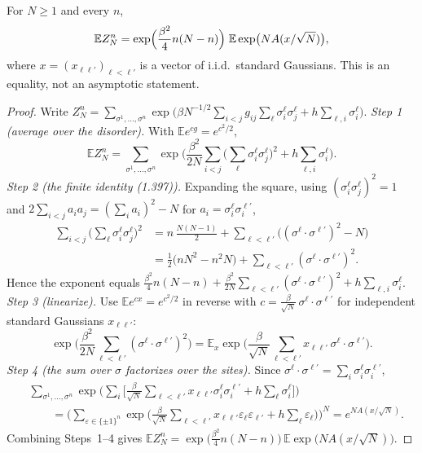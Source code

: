 \begin{lemma}\label{lem:sg-tal:replica-moment}
\leanok
{}
For $N\ge1$ and every $n$,
\[
\mathbb E Z_N^n=\exp\Bigl(\frac{\beta^2}{4}n(N-n)\Bigr)\;\mathbb E\exp\bigl(NA(x/\sqrt N)\bigr),
\]
where $x=(x_{\ell\ell'})_{\ell<\ell'}$ is a vector of i.i.d.\ standard Gaussians. This is an equality, not an asymptotic statement.
\end{lemma}
\begin{proof}
\leanok
Write $Z_N^n=\sum_{\sigma^1,\dots,\sigma^n}\exp\Big(\beta N^{-1/2}\sum_{i<j}g_{ij}\sum_\ell\sigma^\ell_i\sigma^\ell_j+h\sum_{\ell,i}\sigma^\ell_i\Big)$.
\emph{Step 1 (average over the disorder).} With $\mathbb Ee^{cg}=e^{c^2/2}$,
\[
\mathbb EZ_N^n=\sum_{\sigma^1,\dots,\sigma^n}\exp\Big(\frac{\beta^2}{2N}\sum_{i<j}\Big(\sum_\ell\sigma^\ell_i\sigma^\ell_j\Big)^2+h\sum_{\ell,i}\sigma^\ell_i\Big).
\]
\emph{Step 2 (the finite identity (1.397)).} Expanding the square, using $(\sigma^\ell_i\sigma^\ell_j)^2=1$ and $2\sum_{i<j}a_ia_j=(\sum_ia_i)^2-N$ for $a_i=\sigma^\ell_i\sigma^{\ell'}_i$,
\begin{align*}
\sum_{i<j}\Big(\sum_\ell\sigma^\ell_i\sigma^\ell_j\Big)^2&=n\,\frac{N(N-1)}2+\sum_{\ell<\ell'}\big((\sigma^\ell\cdot\sigma^{\ell'})^2-N\big)\\
&=\frac12\big(nN^2-n^2N\big)+\sum_{\ell<\ell'}(\sigma^\ell\cdot\sigma^{\ell'})^2 .
\end{align*}
Hence the exponent equals $\frac{\beta^2}4n(N-n)+\frac{\beta^2}{2N}\sum_{\ell<\ell'}(\sigma^\ell\cdot\sigma^{\ell'})^2+h\sum_{\ell,i}\sigma^\ell_i$.
\emph{Step 3 (linearize).} Use $\mathbb Ee^{cx}=e^{c^2/2}$ in reverse with $c=\frac\beta{\sqrt N}\,\sigma^\ell\cdot\sigma^{\ell'}$ for independent standard Gaussians $x_{\ell\ell'}$:
\[
\exp\Big(\frac{\beta^2}{2N}\sum_{\ell<\ell'}(\sigma^\ell\cdot\sigma^{\ell'})^2\Big)=\mathbb E_x\exp\Big(\frac\beta{\sqrt N}\sum_{\ell<\ell'}x_{\ell\ell'}\,\sigma^\ell\cdot\sigma^{\ell'}\Big).
\]
\emph{Step 4 (the sum over $\sigma$ factorizes over the sites).} Since $\sigma^\ell\cdot\sigma^{\ell'}=\sum_i\sigma^\ell_i\sigma^{\ell'}_i$,
\begin{align*}
&\sum_{\sigma^1,\dots,\sigma^n}\exp\Big(\sum_i\Big[\tfrac\beta{\sqrt N}\sum_{\ell<\ell'}x_{\ell\ell'}\sigma^\ell_i\sigma^{\ell'}_i+h\sum_\ell\sigma^\ell_i\Big]\Big)\\
&\qquad=\Big(\sum_{\varepsilon\in\{\pm1\}^n}\exp\Big(\tfrac\beta{\sqrt N}\sum_{\ell<\ell'}x_{\ell\ell'}\varepsilon_\ell\varepsilon_{\ell'}+h\sum_\ell\varepsilon_\ell\Big)\Big)^N=e^{NA(x/\sqrt N)} .
\end{align*}
Combining Steps~1--4 gives $\mathbb EZ_N^n=\exp\big(\frac{\beta^2}4n(N-n)\big)\,\mathbb E\exp\big(NA(x/\sqrt N)\big)$.
\end{proof}

